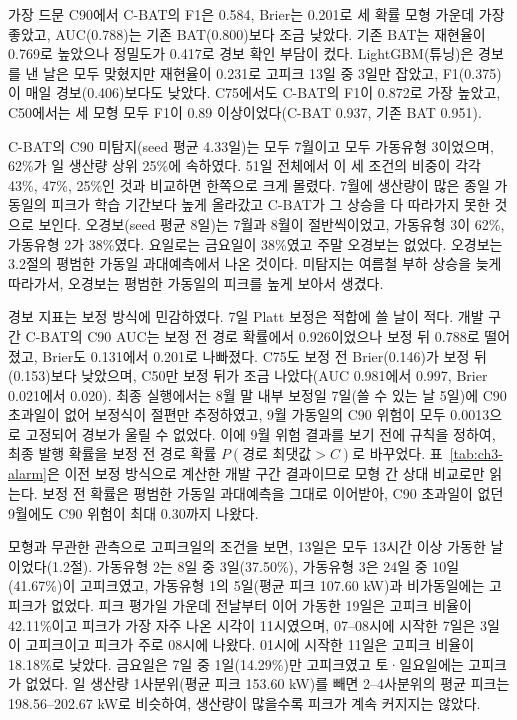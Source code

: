가장 드문 C90에서 C-BAT의 F1은 0.584, Brier는 0.201로 세 확률 모형 가운데 가장 좋았고, AUC(0.788)는 기존 BAT(0.800)보다 조금 낮았다. 기존 BAT는 재현율이 0.769로 높았으나 정밀도가 0.417로 경보 확인 부담이 컸다. LightGBM(튜닝)은 경보를 낸 날은 모두 맞혔지만 재현율이 0.231로 고피크 13일 중 3일만 잡았고, F1(0.375)이 매일 경보(0.406)보다도 낮았다. C75에서도 C-BAT의 F1이 0.872로 가장 높았고, C50에서는 세 모형 모두 F1이 0.89 이상이었다(C-BAT 0.937, 기존 BAT 0.951).

C-BAT의 C90 미탐지(seed 평균 4.33일)는 모두 7월이고 모두 가동유형 3이었으며, 62\%가 일 생산량 상위 25\%에 속하였다. 51일 전체에서 이 세 조건의 비중이 각각 43\%, 47\%, 25\%인 것과 비교하면 한쪽으로 크게 몰렸다. 7월에 생산량이 많은 종일 가동일의 피크가 학습 기간보다 높게 올라갔고 C-BAT가 그 상승을 다 따라가지 못한 것으로 보인다. 오경보(seed 평균 8일)는 7월과 8월이 절반씩이었고, 가동유형 3이 62\%, 가동유형 2가 38\%였다. 요일로는 금요일이 38\%였고 주말 오경보는 없었다. 오경보는 3.2절의 평범한 가동일 과대예측에서 나온 것이다. 미탐지는 여름철 부하 상승을 늦게 따라가서, 오경보는 평범한 가동일의 피크를 높게 보아서 생겼다.

경보 지표는 보정 방식에 민감하였다. 7일 Platt 보정은 적합에 쓸 날이 적다. 개발 구간 C-BAT의 C90 AUC는 보정 전 경로 확률에서 0.926이었으나 보정 뒤 0.788로 떨어졌고, Brier도 0.131에서 0.201로 나빠졌다. C75도 보정 전 Brier(0.146)가 보정 뒤(0.153)보다 낮았으며, C50만 보정 뒤가 조금 나았다(AUC 0.981에서 0.997, Brier 0.021에서 0.020). 최종 실행에서는 8월 말 내부 보정일 7일(쓸 수 있는 날 5일)에 C90 초과일이 없어 보정식이 절편만 추정하였고, 9월 가동일의 C90 위험이 모두 0.0013으로 고정되어 경보가 울릴 수 없었다. 이에 9월 위험 결과를 보기 전에 규칙을 정하여, 최종 발행 확률을 보정 전 경로 확률 $P(\text{경로 최댓값} > C)$로 바꾸었다. 표~\ref{tab:ch3-alarm}은 이전 보정 방식으로 계산한 개발 구간 결과이므로 모형 간 상대 비교로만 읽는다. 보정 전 확률은 평범한 가동일 과대예측을 그대로 이어받아, C90 초과일이 없던 9월에도 C90 위험이 최대 0.30까지 나왔다.


모형과 무관한 관측으로 고피크일의 조건을 보면, 13일은 모두 13시간 이상 가동한 날이었다(1.2절). 가동유형 2는 8일 중 3일(37.50\%), 가동유형 3은 24일 중 10일(41.67\%)이 고피크였고, 가동유형 1의 5일(평균 피크 107.60 kW)과 비가동일에는 고피크가 없었다. 피크 평가일 가운데 전날부터 이어 가동한 19일은 고피크 비율이 42.11\%이고 피크가 가장 자주 나온 시각이 11시였으며, 07--08시에 시작한 7일은 3일이 고피크이고 피크가 주로 08시에 나왔다. 01시에 시작한 11일은 고피크 비율이 18.18\%로 낮았다. 금요일은 7일 중 1일(14.29\%)만 고피크였고 토·일요일에는 고피크가 없었다. 일 생산량 1사분위(평균 피크 153.60 kW)를 빼면 2--4사분위의 평균 피크는 198.56--202.67 kW로 비슷하여, 생산량이 많을수록 피크가 계속 커지지는 않았다.

